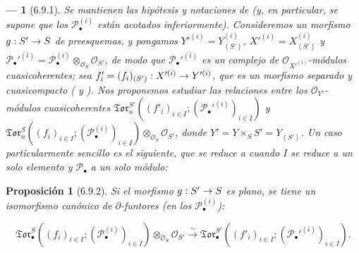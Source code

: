 \documentclass[10pt,oneside,openany]{book}
\theoremstyle{egaenv}\newtheorem*{env}{---}
\theoremstyle{egastatement}
\newtheorem*{proposition}{Proposición}
\theoremstyle{egadescription}
\renewcommand{\to}{\mathchoice{\longrightarrow}{\rightarrow}{\rightarrow}{\rightarrow}}
\begin{document}
\begin{env}[6.9.1]
\label{III.6.9.1}
Se mantienen las hipótesis y notaciones de  (y, en
particular, se supone que los $\mathscr P_\bullet^{(i)}$ están \emph{acotados
inferiormente}). Consideremos un morfismo $g:S'\to S$ de preesquemas, y
pongamos
$Y'^{(i)}=Y_{(S')}^{(i)}$, $X'^{(i)}=X_{(S')}^{(i)}$ y
$\mathscr P_\bullet'^{(i)}=
\mathscr P_\bullet^{(i)}\otimes_{\mathscr O_S}\mathscr O_{S'}$,
de modo que $\mathscr P_\bullet'^{(i)}$ es un complejo de
$\mathscr O_{X'^{(i)}}$-módulos cuasicoherentes; sea
$f'_i=(f_i)_{(S')}:X'^{(i)}\to Y'^{(i)}$, que es un morfismo separado y
cuasicompacto ( y ). Nos proponemos
estudiar las relaciones entre los $\mathscr O_{Y'}$-módulos cuasicoherentes
$\mathfrak{Tor}_n^{S'}((f'_i)_{i\in I};
(\mathscr P_\bullet'^{(i)})_{i\in I})$ y
$\mathfrak{Tor}_n^S((f_i)_{i\in I};
(\mathscr P_\bullet^{(i)})_{i\in I})
\otimes_{\mathscr O_S}\mathscr O_{S'}$, donde
$Y'=Y\times_S S'=Y_{(S')}$. Un caso particularmente sencillo es el
siguiente, que se reduce a  cuando $I$ se reduce a un solo
elemento y $\mathscr P_\bullet$ a un solo módulo:
\end{env}

\begin{proposition}[6.9.2]
\label{III.6.9.2}
Si el morfismo $g:S'\to S$ es plano, se tiene un isomorfismo canónico de
$\partial$-funtores (en los $\mathscr P_\bullet^{(i)}$):

\label{III.6.9.2.1}
\[
  \mathfrak{Tor}_\bullet^S
  ((f_i)_{i\in I};(\mathscr P_\bullet^{(i)})_{i\in I})
  \otimes_{\mathscr O_S}\mathscr O_{S'}
  \xrightarrow{\sim}
  \mathfrak{Tor}_\bullet^{S'}
  ((f'_i)_{i\in I};(\mathscr P_\bullet'^{(i)})_{i\in I}).
  \tag{6.9.2.1}\label{III.6.9.2.1.fr}
\]

\end{proposition}
\end{document}
